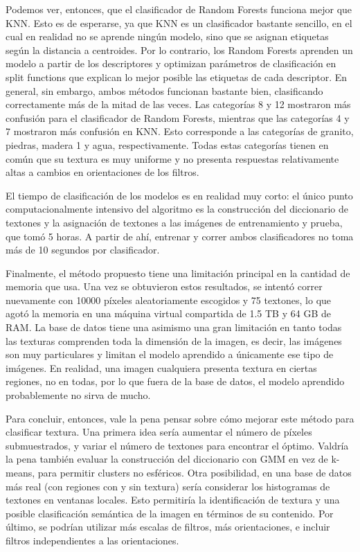 \documentclass[10pt,twocolumn,letterpaper]{article}
\begin{document}
Podemos ver, entonces, que el clasificador de Random Forests funciona mejor que KNN. Esto es de esperarse, ya que KNN es un clasificador bastante sencillo, en el cual en realidad no se aprende ningún modelo, sino que se asignan etiquetas según la distancia a centroides. Por lo contrario, los Random Forests aprenden un modelo a partir de los descriptores y optimizan parámetros de clasificación en split functions que explican lo mejor posible las etiquetas de cada descriptor. En general, sin embargo, ambos métodos funcionan bastante bien, clasificando correctamente más de la mitad de las veces. Las categorías 8 y 12 mostraron más confusión para el clasificador de Random Forests, mientras que las categorías 4 y 7 mostraron más confusión en KNN. Esto corresponde a las categorías de granito, piedras, madera 1 y agua, respectivamente. Todas estas categorías tienen en común que su textura es muy uniforme y no presenta respuestas relativamente altas a cambios en orientaciones de los filtros. 

El tiempo de clasificación de los modelos es en realidad muy corto: el único punto computacionalmente intensivo del algoritmo es la construcción del diccionario de textones y la asignación de textones a las imágenes de entrenamiento y prueba, que tomó 5 horas. A partir de ahí, entrenar y correr ambos clasificadores no toma más de 10 segundos por clasificador. 

Finalmente, el método propuesto tiene una limitación principal en la cantidad de memoria que usa. Una vez se obtuvieron estos resultados, se intentó correr nuevamente con 10000 píxeles aleatoriamente escogidos y 75 textones, lo que agotó la memoria en una máquina virtual compartida de 1.5 TB y 64 GB de RAM. La base de datos tiene una asimismo una gran limitación en tanto todas las texturas comprenden toda la dimensión de la imagen, es decir, las imágenes son muy particulares y limitan el modelo aprendido a únicamente ese tipo de imágenes. En realidad, una imagen cualquiera presenta textura en ciertas regiones, no en todas, por lo que fuera de la base de datos, el modelo aprendido probablemente no sirva de mucho.

Para concluir, entonces, vale la pena pensar sobre cómo mejorar este método para clasificar textura. Una primera idea sería aumentar el número de píxeles submuestrados, y variar el número de textones para encontrar el óptimo. Valdría la pena también evaluar la construcción del diccionario con GMM en vez de k-means, para permitir clusters no esféricos. Otra posibilidad, en una base de datos más real (con regiones con y sin textura) sería considerar los histogramas de textones en ventanas locales. Esto permitiría la identificación de textura y una posible clasificación semántica de la imagen en términos de su contenido. Por último, se podrían utilizar más escalas de filtros, más orientaciones, e incluir filtros independientes a las orientaciones. 





{\small


}
\end{document}
